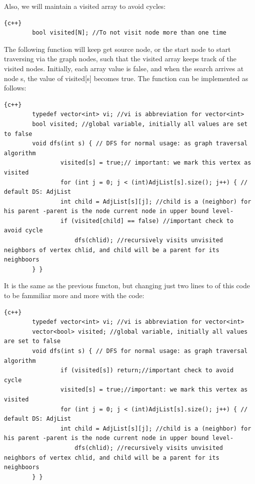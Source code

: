 Also, we will maintain a visited array to avoid cycles:
\begin{lstlisting}{c++}
        bool visited[N]; //To not visit node more than one time
\end{lstlisting}

The following function will keep get source node, or the start node to start traversing via the graph nodes, such that the visited array keeps track of the visited nodes. Initially, each array value is false, and
when the search arrives at node s, the value of visited[s] becomes true. The function can be implemented as follows:
\begin{lstlisting}{c++}
        typedef vector<int> vi; //vi is abbreviation for vector<int>
        bool visited; //global variable, initially all values are set to false
        void dfs(int s) { // DFS for normal usage: as graph traversal algorithm
                visited[s] = true;// important: we mark this vertex as visited
                for (int j = 0; j < (int)AdjList[s].size(); j++) { // default DS: AdjList
                int child = AdjList[s][j]; //child is a (neighbor) for his parent -parent is the node current node in upper bound level-
                if (visited[child] == false) //important check to avoid cycle
                    dfs(chlid); //recursively visits unvisited neighbors of vertex chlid, and child will be a parent for its neighboors
        } }
\end{lstlisting}
It is the same as the previous functon, but changing just two lines to of this code to be fammiliar more and more with the code:
\begin{lstlisting}{c++}
        typedef vector<int> vi; //vi is abbreviation for vector<int>
        vector<bool> visited; //global variable, initially all values are set to false
        void dfs(int s) { // DFS for normal usage: as graph traversal algorithm
                if (visited[s]) return;//important check to avoid cycle
                visited[s] = true;//important: we mark this vertex as visited
                for (int j = 0; j < (int)AdjList[s].size(); j++) { // default DS: AdjList
                int child = AdjList[s][j]; //child is a (neighbor) for his parent -parent is the node current node in upper bound level-
                    dfs(chlid); //recursively visits unvisited neighbors of vertex chlid, and child will be a parent for its neighboors
        } }
\end{lstlisting}





